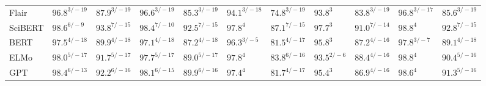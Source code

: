 \documentclass[letterpaper]{article} %
\begin{document}
\begin{table}[h]
\begin{tabular}{l l l l l l l l l l l}
Flair & $96.8^{3/-19}$ & $87.9^{3/-19}$ & $96.6^{3/-19}$ & $85.3^{3/-19}$ & $94.1^{3/-18}$ & $74.8^{3/-19}$ & $93.8^{3}$ & $83.8^{3/-19}$ & $96.8^{3/-17}$ & $85.6^{3/-19}$ \\
SciBERT & $98.6^{6/-9}$ & $93.8^{7/-15}$ & $98.4^{7/-10}$ & $92.5^{7/-15}$ & $97.8^{4}$ & $87.1^{7/-15}$ & $97.7^{3}$ & $91.0^{7/-14}$ & $98.8^{4}$ & $92.8^{7/-15}$ \\
BERT & $97.5^{4/-18}$ & $89.9^{4/-18}$ & $97.1^{4/-18}$ & $87.2^{4/-18}$ & $96.3^{3/-5}$ & $81.5^{4/-17}$ & $95.8^{3}$ & $87.2^{4/-16}$ & $97.8^{3/-7}$ & $89.1^{4/-18}$ \\
ELMo & $98.0^{5/-17}$ & $91.7^{5/-17}$ & $97.7^{5/-17}$ & $89.0^{5/-17}$ & $97.8^{4}$ & $83.8^{6/-16}$ & $93.5^{2/-6}$ & $88.4^{4/-16}$ & $98.8^{4}$ & $90.4^{5/-16}$ \\
GPT & $98.4^{6/-13}$ & $92.2^{6/-16}$ & $98.1^{6/-15}$ & $89.9^{6/-16}$ & $97.4^{4}$ & $81.7^{4/-17}$ & $95.4^{3}$ & $86.9^{4/-16}$ & $98.6^{4}$ & $91.3^{5/-16}$ \\


\end{tabular}
\end{table}
\end{document}
